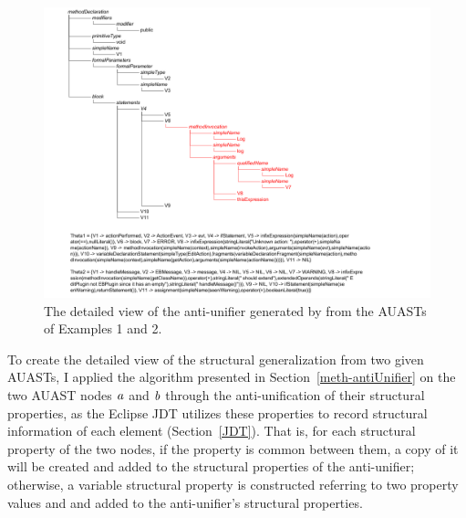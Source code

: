 


\begin{figure} [p]
  \centering\includegraphics [width = \textwidth]{Drawing4/SampleAntiUnifier.png}
  \caption{The detailed view of the anti-unifier generated by  from the AUASTs of Examples 1 and 2.}
  \label{fig:meth-anti-unifier}
\end{figure}



To create the detailed view of the structural generalization from two given AUASTs, I applied the  algorithm presented in Section~\ref{meth-antiUnifier} on the two AUAST nodes $\mathit{a}$ and $\mathit{b}$ through the anti-unification of their structural properties, as the Eclipse JDT utilizes these properties to record structural information of each  element (Section~\ref{JDT}). That is, for each structural property of the two nodes, if the property is common between them, a copy of it will be created and added to the structural properties of the anti-unifier; otherwise, a variable structural property is constructed referring to two property values and and added to the anti-unifier's structural properties.




